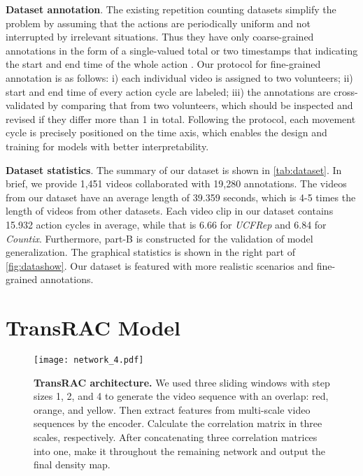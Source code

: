 \documentclass[10pt,twocolumn,letterpaper]{article}
\begin{document}
\noindent \textbf{Dataset annotation}. The existing repetition counting datasets simplify the problem by assuming that the actions are periodically uniform and not interrupted by irrelevant situations. Thus they have only coarse-grained annotations in the form of a single-valued total \cite{RepNet} or two timestamps that indicating the start and end time of the whole action \cite{Zhang_2020_CVPR}. Our protocol for fine-grained annotation is as follows: i) each individual video is assigned to two volunteers; ii) start and end time of every action cycle are labeled; iii) the annotations are cross-validated by comparing that from two volunteers, which should be inspected and revised if they differ more than 1 in total. Following the protocol, each movement cycle is precisely positioned on the time axis, which enables the design and training for models with better interpretability.

\noindent \textbf{Dataset statistics}. The summary of our dataset is shown in \cref{tab:dataset}. In brief, we provide 1,451 videos collaborated with 19,280 annotations. The videos from our dataset have an average length of 39.359 seconds, which is 4-5 times the length of videos from other datasets. Each video clip in our dataset contains 15.932 action cycles in average, while that is 6.66 for \emph{UCFRep} and 6.84 for \emph{Countix}. Furthermore, part-B is constructed for the validation of model generalization. The graphical statistics is shown in the right part of \cref{fig:datashow}. Our dataset is featured with more realistic scenarios and fine-grained annotations.




\section{TransRAC Model}

\begin{figure*}
\centering
\centerline{\texttt{[image: network\_4.pdf]}}\caption{
\textbf{TransRAC architecture.}
We used three sliding windows with step sizes 1, 2, and 4 to generate the video sequence with an overlap: red, orange, and yellow.
Then extract features from multi-scale video sequences by the encoder. Calculate the correlation matrix in three scales, respectively. After concatenating three correlation matrices into one, make it throughout the remaining network and output the final density map.}
\label{fig:overview}
\end{figure*}
\end{document}
